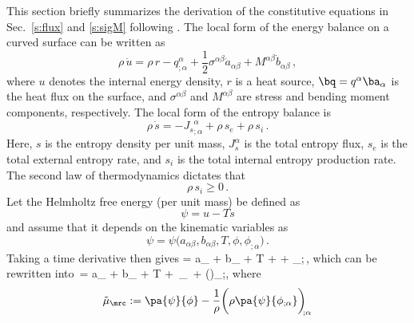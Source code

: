 \documentclass[11pt]{article}
\begin{document}
This section briefly summarizes the derivation of the constitutive equations in Sec.~\ref{s:flux} and \ref{s:sigM} following \citet{sahu17}. 
The local form of the energy balance on a curved surface can be written as 
\begin{equation} \label{e:energy}
\rho\,\dot{u} = \rho\,r - q^\alpha_{; \alpha} + \dfrac{1}{2} \sigma^{\alpha \beta} \dot{a}_{\alpha \beta} + M^{\alpha \beta} \dot{b}_{\alpha \beta}\,,
\end{equation}
%
where $u$ denotes the internal energy density, $r$ is a heat source, $\bq=q^\alpha\ba_\alpha$ is the heat flux on the surface, and $\sigma^{\alpha\beta}$ and $M^{\alpha\beta}$ are stress and bending moment components, respectively. 
The local form of the entropy balance is
\begin{equation} \label{e:entropy}
\rho\,\dot{s} = -{J_s}^{\alpha}_{;\alpha} + \rho\,s_e + \rho\,s_i \,.
\end{equation}
%
Here, $s$ is the entropy density per unit mass, $J_{s}^{\alpha}$ is the total entropy flux, $s_e$ is the total external entropy rate, and $s_i$ is the total internal entropy production rate. 
The second law of thermodynamics dictates that 
\begin{equation}\label{e:2law}
\rho\,s_i \geq 0\,.
\end{equation}
%
Let the Helmholtz free energy (per unit mass) be defined as 
\begin{equation} \label{e:psi}
\psi = u - T s
\end{equation}
%
and assume that it depends on the kinematic variables as
\begin{equation}
\psi = \psi\big(a_{\alpha \beta}, b_{\alpha \beta}, T, \phi, \phi_{;\alpha}\big)\,.
\end{equation}
%
Taking a time derivative then gives 
\dot\psi = \ds{}\dot a_{\alpha\beta} + \dot b_{\alpha\beta} +  \dot T +  \pa{\psi}{\phi}\dot\phi + \pa{\psi}{\phi_{;\alpha}}\dot\phi_{;\alpha}\,,
\eqe
which can be rewritten into
\rho\,\dot\psi = \rho \ds{}\dot a_{\alpha\beta} + \rho {}\dot b_{\alpha\beta} + \rho {}\dot T + 
\rho\,\tilde\mu_\mrc\,\dot\phi
+ \bigg(\rho \pa{\psi}{\phi_{;\alpha}}\dot\phi\bigg)_{\!\!;\alpha},
\label{e:psidot}\eqe
where
\begin{equation}\label{e:chempot}
\tilde\mu_\mrc  := \pa{\psi}{\phi}-\frac{1}{\rho}\bigg(\rho\pa{\psi}{\phi_{;\alpha}}\bigg)_{\!\!;\alpha}
\end{equation}
\end{document}
